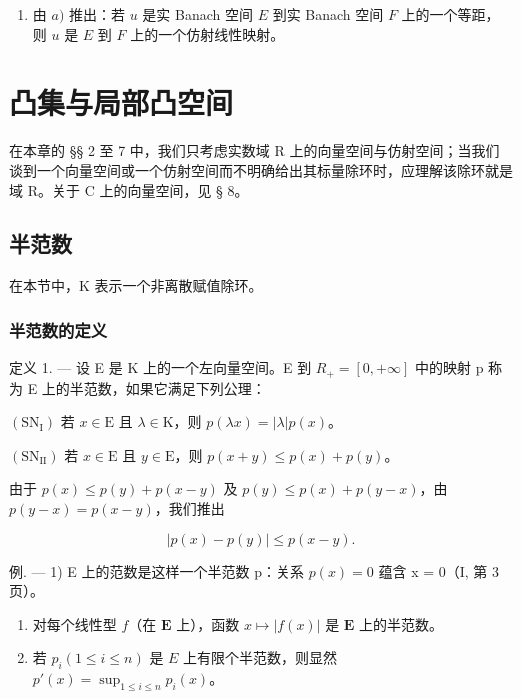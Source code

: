 \begin{enumerate}
\def\labelenumi{\alph{enumi})}
\setcounter{enumi}{1}
\tightlist
\item
  由 \(a)\) 推出：若 \(u\) 是实 Banach 空间 \(E\) 到实 Banach 空间 \(F\) 上的一个等距，则 \(u\) 是 \(E\) 到 \(F\) 上的一个仿射线性映射。
\end{enumerate}

\chapter{凸集与局部凸空间}

在本章的 §§ 2 至 7 中，我们只考虑实数域 R 上的向量空间与仿射空间；当我们谈到一个向量空间或一个仿射空间而不明确给出其标量除环时，应理解该除环就是域 R。关于 C 上的向量空间，见 § 8。

\section{半范数}

在本节中，K 表示一个非离散赋值除环。

\subsection{半范数的定义}

定义 1. --- 设 E 是 K 上的一个左向量空间。E 到 \(R_{+} = \left[0, +\infty\right]\) 中的映射 p 称为 E 上的半范数，如果它满足下列公理：

\((\mathrm{SN}_{\mathrm{I}})\) 若 \(x \in \mathrm{E}\) 且 \(\lambda \in \mathrm{K}\)，则 \(p(\lambda x) = |\lambda| p(x)\)。

\((\mathrm{SN}_{\mathrm{II}})\) 若 \(x \in \mathrm{E}\) 且 \(y \in \mathrm{E}\)，则 \(p(x + y) \leqslant p(x) + p(y)\)。

由于 \(p(x) \leqslant p(y) + p(x - y)\) 及 \(p(y) \leqslant p(x) + p(y - x)\)，由 \(p(y - x) = p(x - y)\)，我们推出

\[
\left| p (x) - p (y) \right| \leqslant p (x - y).\tag{1}
\]

例. --- 1) E 上的范数是这样一个半范数 p：关系 \(p(x) = 0\) 蕴含 x = 0（I, 第 3 页）。

\begin{enumerate}
\def\labelenumi{\arabic{enumi})}
\setcounter{enumi}{1}
\item
  对每个线性型 \(f\)（在 \(\mathbf{E}\) 上），函数 \(x \mapsto |f(x)|\) 是 \(\mathbf{E}\) 上的半范数。
\item
  若 \(p_i (1 \leqslant i \leqslant n)\) 是 \(E\) 上有限个半范数，则显然 \(p'(x) = \sup_{1 \leqslant i \leqslant n} p_i(x)\)。
\end{enumerate}

